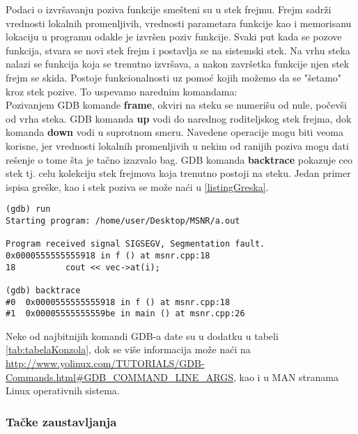 \documentclass[a4paper]{article}
\begin{document}
Podaci o izvršavanju poziva funkcije smešteni su u stek frejmu. Frejm
sadrži vrednosti lokalnih promenljivih, vrednosti parametara funkcije kao
i memorisanu lokaciju u programu odakle je izvršen poziv funkcije. Svaki
put kada se pozove funkcija, stvara se novi stek frejm i postavlja se na
sistemski stek. Na vrhu steka nalazi se funkcija koja se trenutno izvršava,
a nakon završetka funkcije njen stek frejm se skida.
Postoje funkcionalnosti uz pomoć kojih možemo da se "šetamo"{} kroz stek pozive.
To uspevamo narednim komandama: \\
\indent Pozivanjem GDB komande \textbf{frame}, okviri na steku se numerišu od nule, počevši
od vrha steka. \newline 
\indent GDB komanda \textbf{up} vodi do narednog roditeljskog stek frejma, dok komanda \textbf{down} 
vodi u suprotnom smeru. Navedene operacije mogu biti veoma korisne, jer vrednosti lokalnih 
promenljivih u nekim od ranijih poziva mogu dati rešenje o tome šta je tačno izazvalo bag. 
GDB komanda \textbf{backtrace} pokazuje ceo stek tj. celu kolekciju stek frejmova koja trenutno postoji na steku\cite{art_debugging}.
Jedan primer ispisa greške, kao i stek poziva se može naći u  \ref{listingGreska}.


\begin{lstlisting}[caption={Primer ispisa greške u konzoli},frame=single, label=listingGreska]
(gdb) run
Starting program: /home/user/Desktop/MSNR/a.out 

Program received signal SIGSEGV, Segmentation fault.
0x0000555555555918 in f () at msnr.cpp:18
18	        cout << vec->at(i);

(gdb) backtrace
#0  0x0000555555555918 in f () at msnr.cpp:18
#1  0x00005555555559be in main () at msnr.cpp:26
\end{lstlisting}


Neke od najbitnijih komandi GDB-a date su u dodatku u tabeli \ref{tab:tabelaKonzola}, dok se više informacija
može naći na \url{http://www.yolinux.com/TUTORIALS/GDB-Commands.html\#GDB\_COMMAND\_LINE\_ARGS},
kao i u MAN stranama Linux operativnih sistema. 


\subsubsection{Tačke zaustavljanja}
\label{subsec:gdbtackezaustavljanja}
\end{document}
